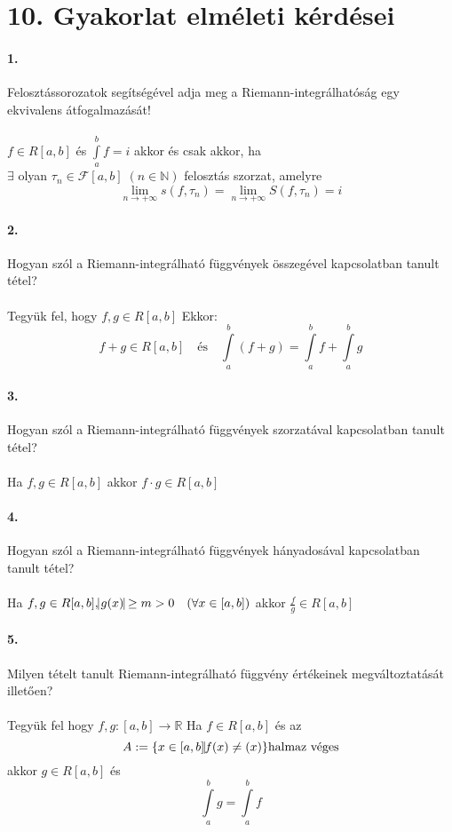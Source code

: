 \documentclass[10pt,a4paper]{article}
\newcommand{\R}{\mathbb{R}}
\newcommand{\pf}{+\infty}
\renewcommand{\>}{\rightarrow}
\renewcommand{\r}{\tau}
\newcommand{\F}{\mathcal{F}}
\newcommand{\abi}{\int\limits_a^b}
\begin{document}
\section{10. Gyakorlat elméleti kérdései}
\paragraph{1. }
Felosztássorozatok segítségével adja meg a Riemann-integrálhatóság egy ekvivalens átfogalmazását! \\\\
$f\in R[a,b]$ és $\int\limits_a^b f = i$ akkor és csak akkor, ha \\
$\exists$ olyan $\r_n \in \F[a,b] \; (n\in\mathbb{N})$ felosztás szorzat, amelyre 
\[
\lim\limits_{n\>\pf} s(f,\r_n) = \lim\limits_{n\>\pf} S(f,\r_n) = i
\]
\paragraph{2. }
Hogyan szól a Riemann-integrálható függvények összegével kapcsolatban tanult tétel?
\\\\
Tegyük fel, hogy $f,g \in R[a,b]$ Ekkor:
\[
f+g \in R[a,b] \quad \text{és} \quad \int\limits_a^b (f+g) = \abi f + \abi g 
\] 
\paragraph{3. }
Hogyan szól a Riemann-integrálható függvények szorzatával kapcsolatban tanult tétel?
\\\\
Ha $f,g \in R[a,b]$ akkor $f\cdot g \in R[a,b]$ 
\paragraph{4. }
Hogyan szól a Riemann-integrálható függvények hányadosával kapcsolatban tanult tétel?
\\\\
Ha $f,g \in R[a,b], \vline g(x) \vline \geq m > 0 \quad (\forall x \in [a,b])$ akkor $\frac{f}{g} \in R[a,b]$
\paragraph{5. }
Milyen tételt tanult Riemann-integrálható függvény értékeinek megváltoztatását illetően?
\\\\
Tegyük fel hogy $f,g : [a,b] \> \R $ Ha $f\in R [a,b]$ és az 
\[
A := \{ x \in [a,b] \vline f(x) \neq (x)\} \text{halmaz véges}
\]
akkor $g\in R[a,b]$ és 
\[
\abi g = \abi f
\]
\end{document}
